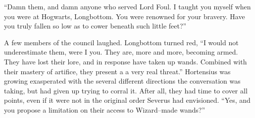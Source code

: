 “Damn them, and damn anyone who served Lord Foul. I taught you myself when you were at Hogwarts, Longbottom. You were renowned for your bravery. Have you truly fallen so low as to cower beneath such little feet?”

A few members of the council laughed. Longbottom turned red, “I would not underestimate them, were I you. They are, more and more, becoming armed. They have lost their lore, and in response have taken up wands. Combined with their mastery of artifice, they present a a very real threat.”
\SmallVSpace
Hortensius was growing exasperated with the several different directions the conversation was taking, but had given up trying to corral it. After all, they had time to cover all points, even if it were not in the original order Severus had envisioned. “Yes, and you propose a limitation on their access to Wizard\mbox{--}made wands?”

